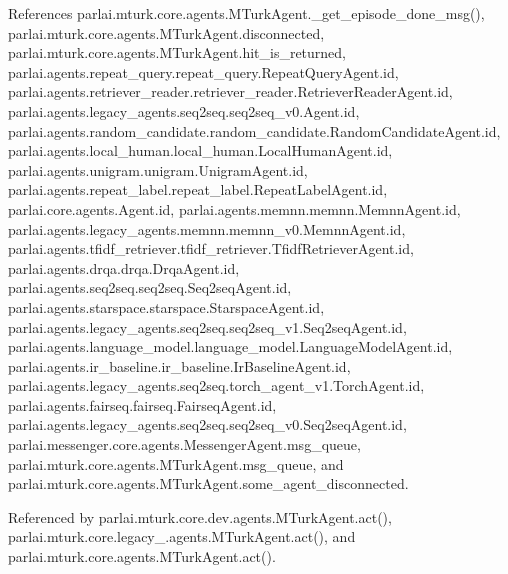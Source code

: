 References parlai.\+mturk.\+core.\+agents.\+M\+Turk\+Agent.\+\_\+get\+\_\+episode\+\_\+done\+\_\+msg(), parlai.\+mturk.\+core.\+agents.\+M\+Turk\+Agent.\+disconnected, parlai.\+mturk.\+core.\+agents.\+M\+Turk\+Agent.\+hit\+\_\+is\+\_\+returned, parlai.\+agents.\+repeat\+\_\+query.\+repeat\+\_\+query.\+Repeat\+Query\+Agent.\+id, parlai.\+agents.\+retriever\+\_\+reader.\+retriever\+\_\+reader.\+Retriever\+Reader\+Agent.\+id, parlai.\+agents.\+legacy\+\_\+agents.\+seq2seq.\+seq2seq\+\_\+v0.\+Agent.\+id, parlai.\+agents.\+random\+\_\+candidate.\+random\+\_\+candidate.\+Random\+Candidate\+Agent.\+id, parlai.\+agents.\+local\+\_\+human.\+local\+\_\+human.\+Local\+Human\+Agent.\+id, parlai.\+agents.\+unigram.\+unigram.\+Unigram\+Agent.\+id, parlai.\+agents.\+repeat\+\_\+label.\+repeat\+\_\+label.\+Repeat\+Label\+Agent.\+id, parlai.\+core.\+agents.\+Agent.\+id, parlai.\+agents.\+memnn.\+memnn.\+Memnn\+Agent.\+id, parlai.\+agents.\+legacy\+\_\+agents.\+memnn.\+memnn\+\_\+v0.\+Memnn\+Agent.\+id, parlai.\+agents.\+tfidf\+\_\+retriever.\+tfidf\+\_\+retriever.\+Tfidf\+Retriever\+Agent.\+id, parlai.\+agents.\+drqa.\+drqa.\+Drqa\+Agent.\+id, parlai.\+agents.\+seq2seq.\+seq2seq.\+Seq2seq\+Agent.\+id, parlai.\+agents.\+starspace.\+starspace.\+Starspace\+Agent.\+id, parlai.\+agents.\+legacy\+\_\+agents.\+seq2seq.\+seq2seq\+\_\+v1.\+Seq2seq\+Agent.\+id, parlai.\+agents.\+language\+\_\+model.\+language\+\_\+model.\+Language\+Model\+Agent.\+id, parlai.\+agents.\+ir\+\_\+baseline.\+ir\+\_\+baseline.\+Ir\+Baseline\+Agent.\+id, parlai.\+agents.\+legacy\+\_\+agents.\+seq2seq.\+torch\+\_\+agent\+\_\+v1.\+Torch\+Agent.\+id, parlai.\+agents.\+fairseq.\+fairseq.\+Fairseq\+Agent.\+id, parlai.\+agents.\+legacy\+\_\+agents.\+seq2seq.\+seq2seq\+\_\+v0.\+Seq2seq\+Agent.\+id, parlai.\+messenger.\+core.\+agents.\+Messenger\+Agent.\+msg\+\_\+queue, parlai.\+mturk.\+core.\+agents.\+M\+Turk\+Agent.\+msg\+\_\+queue, and parlai.\+mturk.\+core.\+agents.\+M\+Turk\+Agent.\+some\+\_\+agent\+\_\+disconnected.



Referenced by parlai.\+mturk.\+core.\+dev.\+agents.\+M\+Turk\+Agent.\+act(), parlai.\+mturk.\+core.\+legacy\+\_.\+agents.\+M\+Turk\+Agent.\+act(), and parlai.\+mturk.\+core.\+agents.\+M\+Turk\+Agent.\+act().

